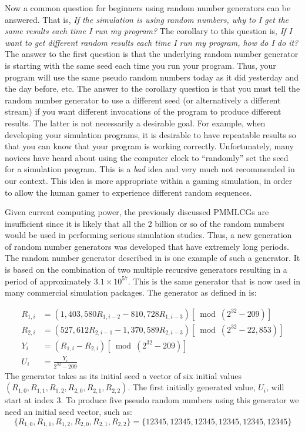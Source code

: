 \documentclass[
]{book}
\theoremstyle{definition}
\theoremstyle{definition}
\theoremstyle{definition}
\theoremstyle{definition}
\theoremstyle{remark}
\begin{document}
Now a common question for beginners using random number generators can
be answered. That is, \emph{If the simulation is using random numbers, why to
I get the same results each time I run my program?} The corollary to
this question is, \emph{If I want to get different random results each time I
run my program, how do I do it?} The answer to the first question is
that the underlying random number generator is starting with the same
seed each time you run your program. Thus, your program will use the
same pseudo random numbers today as it did yesterday and the day before,
etc. The answer to the corollary question is that you must tell the
random number generator to use a different seed (or alternatively a
different stream) if you want different invocations of the program to
produce different results. The latter is not necessarily a desirable
goal. For example, when developing your simulation programs, it is
desirable to have repeatable results so that you can know that your
program is working correctly. Unfortunately, many novices have heard
about using the computer clock to ``randomly'' set the seed for a
simulation program. This is a \emph{bad} idea and very much not recommended
in our context. This idea is more appropriate within a gaming
simulation, in order to allow the human gamer to experience different
random sequences.

Given current computing power, the previously discussed PMMLCGs are
insufficient since it is likely that all the 2 billion or so of the
random numbers would be used in performing serious simulation studies.
Thus, a new generation of random number generators was developed that
have extremely long periods. The random number generator described in
\citet{ecuyer2002an} is one example of such a generator. It is based on the
combination of two multiple recursive generators resulting in a period
of approximately \(3.1 \times 10^{57}\). This is the same generator that
is now used in many commercial simulation packages. The generator as
defined in \citep{law2007simulation} is:

\[
\begin{split}
R_{1,i}&=(1,403,580 R_{1,i-2} - 810,728 R_{1,i-3})[\bmod (2^{32}-209)]\\
R_{2,i}&=(527,612R_{2,i-1} - 1,370,589 R_{2,i-3})[\bmod (2^{32}-22,853)]\\
Y_i &=(R_{1,i}-R_{2,i})[\bmod(2^{32}-209)]\\
U_i&=\frac{Y_i}{2^{32}-209}
\end{split}
\]
The generator takes as its initial seed a vector of six initial values
\((R_{1,0}, R_{1,1}, R_{1,2}, R_{2,0}, R_{2,1}, R_{2,2})\). The first
initially generated value, \(U_{i}\), will start at index \(3\). To produce five pseudo random numbers using this generator we need an initial seed vector, such as:
\[\lbrace R_{1,0}, R_{1,1}, R_{1,2}, R_{2,0}, R_{2,1}, R_{2,2} \rbrace = \lbrace 12345, 12345, 12345, 12345, 12345, 12345\rbrace\]
\end{document}

